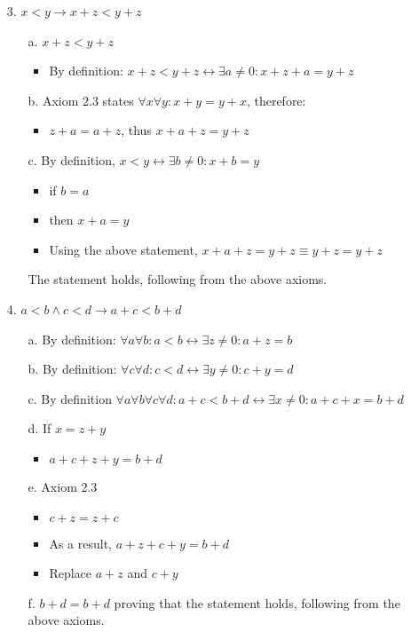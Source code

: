 \documentclass[12pt]{article}
\begin{document}
\begin{enumerate}
\item[3.] ${x < y \rightarrow x + z < y + z}$
  \begin{enumerate}
    \item[a.] ${x + z < y + z}$ 
      \begin{itemize}
        \item By definition: ${x + z < y + z \leftrightarrow \exists a \neq 0 : x + z + a = y + z}$
      \end{itemize}
    \item[b.] Axiom 2.3 states ${\forall x \forall y : x + y = y + x}$, therefore:
      \begin{itemize}
        \item ${z + a = a + z}$, thus ${x + a + z = y + z}$
      \end{itemize}
    \item[c.] By definition, ${x < y \leftrightarrow \exists b \neq 0 : x + b = y}$
      \begin{itemize}
        \item if ${b = a}$
        \item then ${x + a = y}$
        \item Using the above statement, ${x + a + z = y + z \equiv y + z = y + z}$
      \end{itemize}

      The statement holds, following from the above axioms.
  \end{enumerate}
\item[4.] ${a < b \wedge c < d \rightarrow a + c < b + d}$
  \begin{enumerate}
    \item[a.] By definition: ${\forall a \forall b : a < b \leftrightarrow \exists z \neq 0 : a + z = b}$
    \item[b.] By definition: ${\forall c \forall d : c < d \leftrightarrow \exists y \neq 0 : c + y = d}$
    \item[c.] By definition ${\forall a \forall b \forall c \forall d : a + c < b + d \leftrightarrow \exists x \neq 0 : a + c + x = b + d}$
    \item[d.] If ${x = z + y}$
      \begin{itemize}
        \item ${a + c + z + y = b + d}$
      \end{itemize}
    \item[e.] Axiom 2.3
      \begin{itemize}
        \item ${c + z = z + c}$
        \item As a result, ${a + z + c + y = b + d}$
        \item Replace ${a + z}$ and ${c + y}$ 
      \end{itemize}
    \item[f.] ${b + d = b + d}$ proving that the statement holds, following from the above axioms.
  \end{enumerate}
\end{enumerate}
\end{document}
